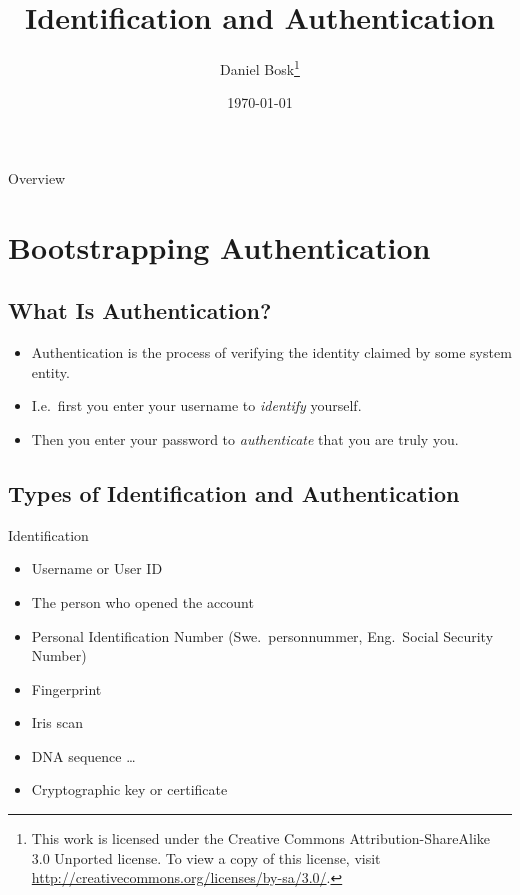 \documentclass{beamer}
\title[Authentication]{%
  Identification and Authentication
}
\author{Daniel Bosk\footnote{%
  This work is licensed under the Creative Commons Attribution-ShareAlike 3.0 
  Unported license.
	To view a copy of this license, visit 
	\url{http://creativecommons.org/licenses/by-sa/3.0/}.
}}
\institute[MIUN ICS]{%
  Department of Information and Communication Systems (ICS),\\
  Mid Sweden University, Sundsvall.
}
\date{\today}
\begin{document}
\begin{frame}
  \titlepage{}
\end{frame}

\begin{frame}{Overview}
  \tableofcontents
\end{frame}





\section[Bootstrapping]{Bootstrapping Authentication}

\subsection{What Is Authentication?}

\begin{frame}{\insertsubsectionhead}
  \begin{itemize}
    \item Authentication is the process of verifying the identity claimed by 
      some system entity.

    \item I.e.\ first you enter your username to \emph{identify} yourself.

    \item Then you enter your password to \emph{authenticate} that you are 
      truly you.

  \end{itemize}
\end{frame}

\subsection{Types of Identification and Authentication}

\begin{frame}{\insertsubsectionhead}{Identification}
  \begin{itemize}
    \item Username or User ID
    \item The person who opened the account
    \item Personal Identification Number (Swe.\ personnummer, Eng.\ Social 
      Security Number)
    \item Fingerprint
    \item Iris scan
    \item DNA sequence \dots
    \item Cryptographic key or certificate
  \end{itemize}
\end{frame}
\end{document}
